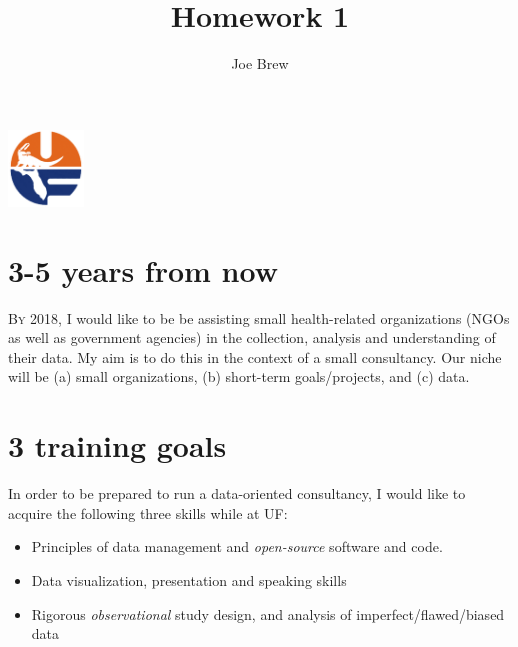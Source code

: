 \documentclass[11pt]{article}
\begin{document}


\title{\textbf{Homework 1}}
\author{Joe Brew}


\maketitle



\begin{center}
\includegraphics[width=2cm]{uf}
\end{center}


\fancyhfoffset[E,O]{0pt}


\hrulefill


\section{3-5 years from now}

\lettrine[nindent=0em,lines=3]{B}{y} 2018, I would like to be be assisting small health-related organizations (NGOs as well as government agencies) in the collection, analysis and understanding of their data.  My aim is to do this in the context of a small consultancy.  Our niche will be (a) small organizations, (b) short-term goals/projects, and (c) data.   

\section{3 training goals}
In order to be prepared to run a data-oriented consultancy, I would like to acquire the following three skills while at UF:
\begin{itemize}
\itemsep1pt \parskip0pt  
\item Principles of data management and \emph{open-source} software and code.
\item Data visualization, presentation and speaking skills
\item Rigorous \emph{observational} study design, and analysis of imperfect/flawed/biased data
\end{itemize}
\end{document}

